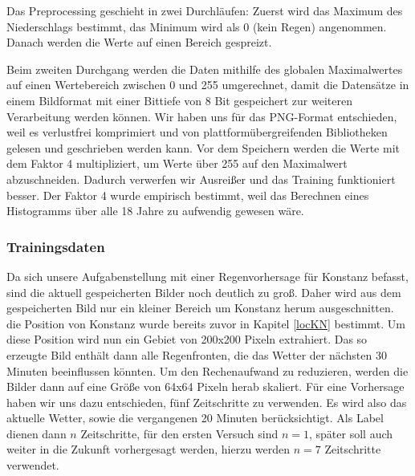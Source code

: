 Das Preprocessing geschieht in zwei Durchläufen: Zuerst wird das Maximum des Niederschlags bestimmt, das Minimum wird als 0 (kein Regen) angenommen. Danach werden die Werte auf einen Bereich gespreizt.

Beim zweiten Durchgang werden die Daten mithilfe des globalen Maximalwertes auf einen Wertebereich zwischen 0 und 255 umgerechnet, damit die Datensätze in einem Bildformat mit einer Bittiefe von 8 Bit gespeichert zur weiteren Verarbeitung werden können. Wir haben uns für das PNG-Format entschieden, weil es verlustfrei komprimiert und von plattformübergreifenden Bibliotheken gelesen und geschrieben werden kann.
Vor dem Speichern werden die Werte mit dem Faktor 4 multipliziert, um Werte über 255 auf den Maximalwert abzuschneiden. Dadurch verwerfen wir Ausreißer und das Training funktioniert besser. Der Faktor 4 wurde empirisch bestimmt, weil das Berechnen eines Histogramms über alle 18 Jahre zu aufwendig gewesen wäre.

\subsubsection{Trainingsdaten}
\label{Samples}
Da sich unsere Aufgabenstellung mit einer Regenvorhersage für Konstanz befasst, sind die aktuell gespeicherten Bilder noch deutlich zu groß. Daher wird aus dem gespeicherten Bild nur ein kleiner Bereich um Konstanz herum ausgeschnitten. die Position von Konstanz wurde bereits zuvor in Kapitel \ref{locKN} bestimmt. Um diese Position wird nun ein Gebiet von 200x200 Pixeln extrahiert. Das so erzeugte Bild enthält dann alle Regenfronten, die das Wetter der nächsten 30 Minuten beeinflussen könnten. Um den Rechenaufwand zu reduzieren, werden die Bilder dann auf eine Größe von 64x64 Pixeln herab skaliert. Für eine Vorhersage haben wir uns dazu entschieden, fünf Zeitschritte zu verwenden. Es wird also das aktuelle Wetter, sowie die vergangenen 20 Minuten berücksichtigt.
Als Label dienen dann $n$ Zeitschritte, für den ersten Versuch sind $n = 1$, später soll auch weiter in die Zukunft vorhergesagt werden, hierzu werden $n = 7$ Zeitschritte verwendet.

